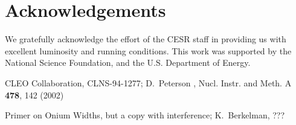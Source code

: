 \documentclass[aps,prd,preprint,superscriptaddress,tightenlines,nofootinbib,floatfix]{revtex4}
\begin{document}
%
\section{Acknowledgements}
%
We gratefully acknowledge the effort of the CESR staff in providing us
with excellent luminosity and running conditions.  This work was
supported by the National Science Foundation, and the U.S. Department
of Energy.

%
%

%
%
\def\endpoint{;~~}
\def\Journal#1&#2&#3(#4){#1{\bf #2}, #3 (#4)}
\def\NIM{Nucl. Instr. and Meth. }
\def\NIMA{Nucl. Instr. and Meth. A }
\def\NPB{Nucl. Phys. B }
\def\PLB{Phys. Lett. B }
\def\PRL{Phys. Rev. Lett. }
\def\PRD{Phys. Rev. D }
\newpage
\begin{thebibliography}{99}

     CLEO Collaboration, CLNS-94-1277; D.\ Peterson \etal, {\Journal\NIMA&478&142(2002)}

     Primer on Onium Widths, but a copy with interference; K.\ Berkelman, ???

\end{thebibliography}
\end{document}

